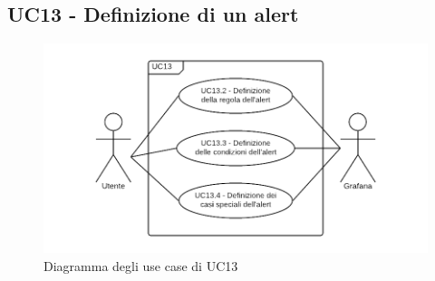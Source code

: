 \subsection{UC13 - Definizione di un alert}
\begin{figure}[H]
\includegraphics{img/UC13_-_Definizione_di_un_alert.png}
\caption{Diagramma degli use case di UC13}
\end{figure}
